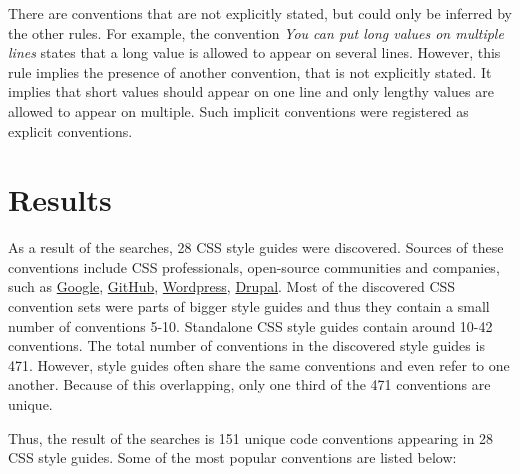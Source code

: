 There are conventions that are not explicitly stated, but could only be inferred by the other rules.
For example, the convention \textit{You can put long values on multiple lines} states that a long
value is allowed to appear on several lines. However, this rule implies the presence of another
convention, that is not explicitly stated. It implies that short values should appear on one line
and only lengthy values are allowed to appear on multiple. Such implicit conventions were registered
as explicit conventions.

\section{Results}

As a result of the searches, 28 CSS style guides were discovered. Sources of these conventions include CSS professionals, open-source communities and companies, such as \href{https://google-styleguide.googlecode.com/svn/trunk/htmlcssguide.xml#Protocol}{Google}, \href{http://primercss.io/guidelines/#css}{GitHub}, \href{https://make.wordpress.org/core/handbook/best-practices/coding-standards/css/}{Wordpress}, \href{https://www.drupal.org/node/1887862}{Drupal}. Most of the discovered CSS convention sets were parts of bigger style guides and thus they contain a small number of conventions 5-10. Standalone CSS style guides contain around 10-42 conventions. The total number of conventions in the discovered style guides is 471. However, style guides often share the same conventions and even refer to one another. Because of this overlapping, only one third of the 471 conventions are unique.

Thus, the result of the searches is 151 unique code conventions appearing in 28 CSS style guides. Some of the most popular conventions are listed below: 

